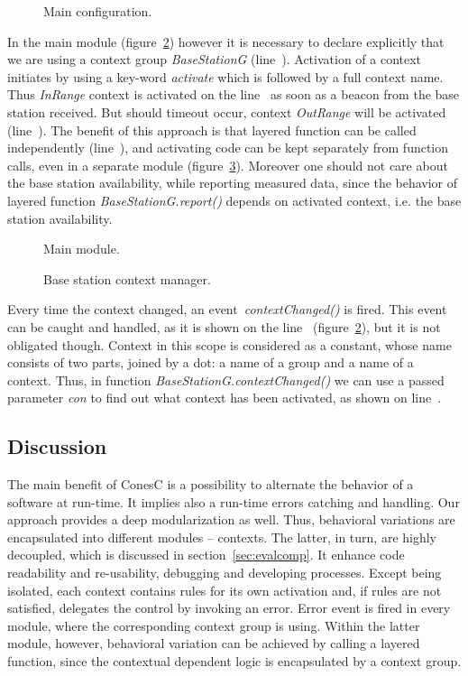 
\begin{figure}[!h]
\TheSbox
\caption{Main configuration.}
\label{fig:mc}
\end{figure}

In the main module (figure~\ref{fig:mm}) however it is necessary to declare
explicitly that we are using a context group \emph{BaseStationG}
(line~). Activation of a context initiates by using a key-word
\emph{activate} which is followed by a full context name. Thus
\emph{InRange} context is activated on the line~ as soon as a
beacon from the base station received. But should timeout occur, context
\emph{OutRange} will be activated (line~). The benefit of
this approach is that layered function can be called independently
(line~), and activating code can be kept separately from function
calls, even in a separate module (figure~\ref{fig:bscm}).
Moreover one should not care about the base station availability, while
reporting measured data, since the behavior of layered function
\emph{BaseStationG.report()} depends on activated context, i.e. the base
station availability.


\begin{figure}[!h]
\TheSbox
\caption{Main module.}
\label{fig:mm}
\end{figure}


\begin{figure}[!h]
\TheSbox
\caption{Base station context manager.}
\label{fig:bscm}
\end{figure}

Every time the context changed, an event~\emph{contextChanged()} is fired. This event can be
caught and handled, as it is shown on the line~ (figure~\ref{fig:mm}),
but it is not obligated though. Context in this scope is considered as a constant,
whose name consists of two parts, joined by a dot: a name of a group and a name
of a context. Thus, in function \emph{BaseStationG.contextChanged()} we can use
a passed parameter \emph{con} to find out what context has been activated, as
shown on line~.

\subsection{Discussion}

The main benefit of ConesC is a possibility to alternate the behavior of a software at
run-time. It implies also a run-time errors catching and handling. Our approach
provides a deep modularization as well. Thus, behavioral variations are encapsulated
into different modules -- contexts. The latter, in turn, are highly decoupled, which
is discussed in section~\ref{sec:evalcomp}. It enhance code readability and re-usability, debugging
and developing processes. Except being isolated, each context contains rules for its
own activation and, if rules are not satisfied, delegates the control by invoking an error.
Error event is fired in every module, where the corresponding context group is using.
Within the latter module, however, behavioral variation can be achieved by calling a
layered function, since the contextual dependent logic is encapsulated by a context group.
